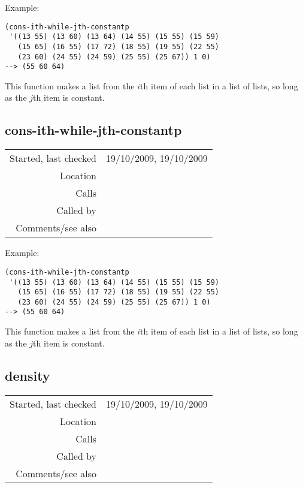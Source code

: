 \vspace{0.5cm}
\noindent Example:
\begin{verbatim}
(cons-ith-while-jth-constantp
 '((13 55) (13 60) (13 64) (14 55) (15 55) (15 59)
   (15 65) (16 55) (17 72) (18 55) (19 55) (22 55)
   (23 60) (24 55) (24 59) (25 55) (25 67)) 1 0)
--> (55 60 64)
\end{verbatim}

\noindent This function makes a list from the $i$th
item of each list in a list of lists, so long as the
$j$th item is constant.


\subsection*{cons-ith-while-jth-constantp}\label{fun:cons-ith-while-jth-constantp}

\vspace{0.3cm}
\begin{tabular}{r|p{8cm}}
Started, last checked & 19/10/2009, 19/10/2009 \\
Location & \nameref{sec:musical-properties} \\
Calls & \\
Called by & \nameref{fun:top-line} \\
Comments/see also & \nameref{fun:cons-ith-while-floor-jth-constantp}
\end{tabular}

\vspace{0.5cm}
\noindent Example:
\begin{verbatim}
(cons-ith-while-jth-constantp
 '((13 55) (13 60) (13 64) (14 55) (15 55) (15 59)
   (15 65) (16 55) (17 72) (18 55) (19 55) (22 55)
   (23 60) (24 55) (24 59) (25 55) (25 67)) 1 0)
--> (55 60 64)
\end{verbatim}

\noindent This function makes a list from the $i$th
item of each list in a list of lists, so long as the
$j$th item is constant.


\subsection*{density}\label{fun:density}

\vspace{0.3cm}
\begin{tabular}{r|p{8cm}}
Started, last checked & 19/10/2009, 19/10/2009 \\
Location & \nameref{sec:musical-properties} \\
Calls & \nameref{fun:cons-ith-while-floor-jth-constantp} \\
Called by & \nameref{fun:rhythmic-density} \\
Comments/see also &
\end{tabular}

